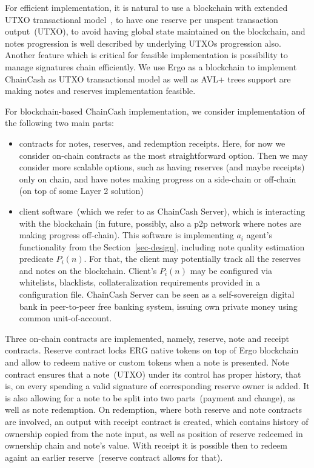 \documentclass{llncs}   %
\newcommand{\cc}{ChainCash}
\begin{document}
For efficient implementation, it is natural to use a blockchain with extended UTXO transactional model~\cite{chakravarty2020extended}, to have one reserve per unspent transaction output~(UTXO), to
avoid having global state maintained on the blockchain, and notes progression is well described by underlying UTXOs progression also. Another feature which is critical for feasible implementation is
possibility to manage signatures chain efficiently. We use Ergo as a blockchain to implement \cc{} as UTXO transactional model as well as AVL+ trees support are making notes and reserves implementation feasible.

For blockchain-based \cc{} implementation, we consider implementation of the following two main parts:

\begin{itemize}
  \item{} contracts for notes, reserves, and redemption receipts. Here, for now we consider on-chain contracts as the most
  straightforward option. Then we may consider more scalable options, such as having reserves (and maybe receipts) only
  on chain, and have notes making progress on a side-chain or off-chain (on top of some Layer 2 solution)
  \item{} client software~(which we refer to as \cc{} Server), which is interacting with the blockchain (in future, possibly, also a p2p network
  where notes are making progress off-chain). This software is implementing $a_i$ agent's functionality from the Section~\ref{sec-design},
  including note quality estimation predicate $P_i(n)$. For that, the client may potentially track all the reserves and notes on the blockchain.
  Client's $P_i(n)$ may be configured via whitelists, blacklists, collateralization requirements provided in a configuration file.
  \cc{} Server can be seen as a self-sovereign digital bank in peer-to-peer free banking system, issuing own private money using common unit-of-account.
\end{itemize}

Three on-chain contracts are implemented, namely, reserve, note and receipt contracts. Reserve contract locks ERG native tokens on top of Ergo blockchain and allow to redeem native or custom tokens when a note is presented. Note contract ensures that a note~(UTXO) under its control has proper history, that is, on every spending a valid signature of corresponding reserve owner is added. It is also allowing for a note to be split into two parts~(payment and change), as well as note redemption.
On redemption, where both reserve and note contracts are involved, an output with receipt contract is created, which contains history of ownership copied from the note input, as well as position of reserve redeemed in ownership chain and note's value. With receipt it is possible then to redeem againt an earlier reserve~(reserve contract allows for that).
\end{document}
